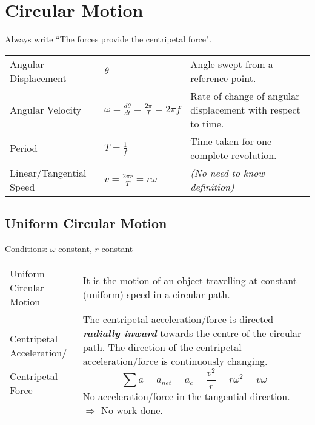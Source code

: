 \documentclass[a4paper]{article}
\begin{document}
	\section{Circular Motion}
		Always write ``The \underline{\hspace{1.5cm}} forces provide the centripetal force".
		\begin{center}
			\renewcommand{\arraystretch}{1.5}
			\begin{tabular}{@{} l l p{7cm} @{}}
				\toprule
				Angular Displacement & $\theta$ & Angle swept from a reference point. \\
				Angular Velocity & $\omega=\frac{d\theta}{dt}=\frac{2\pi}{T}=2\pi f$ & Rate of change of angular displacement with respect to time. \\
				Period & $T=\frac{1}{f}$ & Time taken for one complete revolution. \\
				Linear/Tangential Speed & $v=\frac{2\pi r}{T}=r\omega$ & \textit{(No need to know definition)}\\
				\bottomrule
			\end{tabular}
		\end{center}
		\subsection{Uniform Circular Motion}
			Conditions: $\omega$ constant, $r$ constant
			\begin{center}
				\renewcommand{\arraystretch}{1.2}
				\begin{tabular}{@{} p{3.7cm} p{10cm} @{}}
					\toprule
					Uniform Circular Motion & It is the motion of an object travelling at constant (uniform) speed in a circular path. \\
					Centripetal Acceleration/ \par Centripetal Force& The centripetal acceleration/force is directed \textbf{\textit{radially inward}} towards the centre of the circular path. The direction of the centripetal acceleration/force is continuously changing. $$\sum a = a_{net} = a_c=\frac{v^2}{r}=r\omega^2=v\omega$$ No acceleration/force in the tangential direction. $\Rightarrow$ No work done. 
					\\
					\bottomrule
				\end{tabular}
			\end{center}
\end{document}
